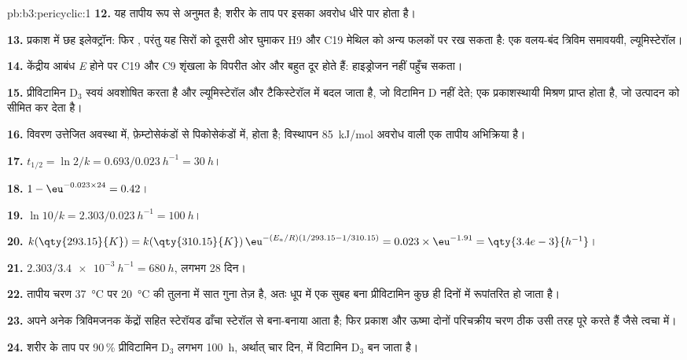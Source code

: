 \begin{solution}{pb:b3:pericyclic:1}
\textbf{12.} यह तापीय रूप से अनुमत है; शरीर के ताप पर इसका अवरोध धीरे पार होता है।

\textbf{13.} प्रकाश में छह इलेक्ट्रॉन: फिर , परंतु यह सिरों को
दूसरी ओर घुमाकर H9 और C19 मेथिल को अन्य फलकों पर रख सकता है: एक वलय-बंद
त्रिविम समावयवी, ल्यूमिस्टेरॉल।

\textbf{14.} केंद्रीय आबंध \textit{E} होने पर C19 और C9 शृंखला के विपरीत ओर और बहुत
दूर होते हैं: हाइड्रोजन नहीं पहुँच सकता।

\textbf{15.} प्रीविटामिन D$_3$ स्वयं अवशोषित करता है और ल्यूमिस्टेरॉल और टैकिस्टेरॉल में बदल जाता है,
जो विटामिन D नहीं देते; एक प्रकाशस्थायी मिश्रण प्राप्त होता है, जो
उत्पादन को सीमित कर देता है।

\textbf{16.} विवरण उत्तेजित अवस्था में, फ़ेम्टोसेकंडों से पिकोसेकंडों में, होता है;
विस्थापन \qty{85}{kJ/mol} अवरोध वाली एक तापीय अभिक्रिया है।

\textbf{17.} $t_{1/2} = \ln 2/k = 0.693/\qty{0.023}{h^{-1}} = \qty{30}{h}$।

\textbf{18.} $1 - \eu^{-0.023 \times 24} = 0.42$।

\textbf{19.} $\ln 10/k = 2.303/\qty{0.023}{h^{-1}} = \qty{100}{h}$।

\textbf{20.} $k(\qty{293.15}{K}) = k(\qty{310.15}{K})\,\eu^{-(E_a/R)(1/293.15 - 1/310.15)} = 0.023 \times \eu^{-1.91} = \qty{3.4e-3}{h^{-1}}$।

\textbf{21.} $2.303/\qty{3.4e-3}{h^{-1}} = \qty{680}{h}$, लगभग 28 दिन।

\textbf{22.} तापीय चरण \qty{37}{\celsius} पर \qty{20}{\celsius} की तुलना में सात गुना तेज़ है, अतः
धूप में एक सुबह बना प्रीविटामिन कुछ ही दिनों में रूपांतरित हो जाता है।

\textbf{23.} अपने अनेक त्रिविमजनक केंद्रों सहित स्टेरॉयड ढाँचा स्टेरॉल से
बना-बनाया आता है; फिर प्रकाश और ऊष्मा दोनों परिचक्रीय चरण ठीक उसी तरह पूरे करते हैं जैसे
त्वचा में।

\textbf{24.} शरीर के ताप पर 90\,\% प्रीविटामिन D$_3$ लगभग
\qty{100}{h}, अर्थात् चार दिन, में विटामिन D$_3$ बन जाता है।
\end{solution}

